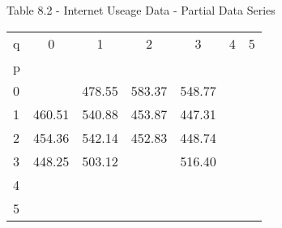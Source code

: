 \documentclass{article}
\begin{document}
\begin{center}
Table 8.2 - Internet Useage Data - Partial Data Series
\end{center}
\begin{center}
\begin{tabular}{ l c c c c c c} 
q & 0 & 1 & 2 & 3 & 4 & 5 \\
p & & & & & & \\
0 &   & 478.55 & 583.37 & 548.77 &   &   \\
1 & 460.51 & 540.88 & 453.87 & 447.31 &   &   \\
2 & 454.36 & 542.14 & 452.83 & 448.74 &   &   \\
3 & 448.25 & 503.12 &   & 516.40 &   &   \\
4 &   &   &   &   &   &   \\
5 &   &   &   &   &   &  
\end{tabular}
\end{center}
\end{document}
